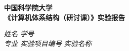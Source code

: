 \begin{center}
  \LARGE \bf 中国科学院大学 \\《计算机体系结构（研讨课）》实验报告
\end{center}

\begin{center}
  \emph{姓名} \underline{\makebox[11em][c]{\name}} 
  \emph{学号} \underline{\makebox[30.5em][c]{\studentNum}}\\
  \emph{专业} \underline{\makebox[12em][c]{\major}}
  \emph{实验项目编号} \underline{\makebox[5em][c]{\labNum}}
  \emph{实验名称} \underline{\makebox[16em][c]{\labName}}\\
\end{center}




  